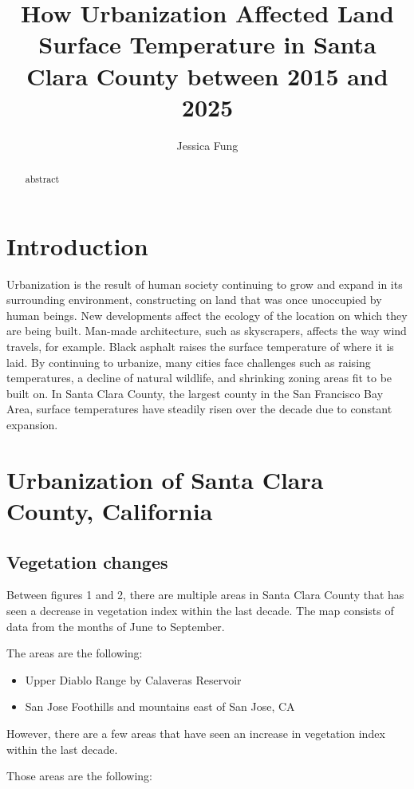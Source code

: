 \documentclass{article}
\title{How Urbanization Affected Land Surface Temperature in Santa Clara County between 2015 and 2025}
\author{Jessica Fung}
\begin{document}
\maketitle

\begin{abstract}
abstract
\end{abstract}

\section{Introduction}
Urbanization is the result of human society continuing to grow and expand in its surrounding environment, constructing on land that was once unoccupied by human beings. New developments affect the ecology of the location on which they are being built. Man-made architecture, such as skyscrapers, affects the way wind travels, for example. Black asphalt raises the surface temperature of where it is laid. By continuing to urbanize, many cities face challenges such as raising temperatures, a decline of natural wildlife, and shrinking zoning areas fit to be built on. In Santa Clara County, the largest county in the San Francisco Bay Area, surface temperatures have steadily risen over the decade due to constant expansion. 


\section{Urbanization of Santa Clara County, California}

\subsection{Vegetation changes}
Between figures 1 and 2, there are multiple areas in Santa Clara County that has seen a decrease in vegetation index within the last decade. The map consists of data from the months of June to September. 

The areas are the following:
\begin{itemize}
    \item Upper Diablo Range by Calaveras Reservoir
    \item San Jose Foothills and mountains east of San Jose, CA
\end{itemize}

However, there are a few areas that have seen an increase in vegetation index within the last decade. 

Those areas are the following:
\end{document}
